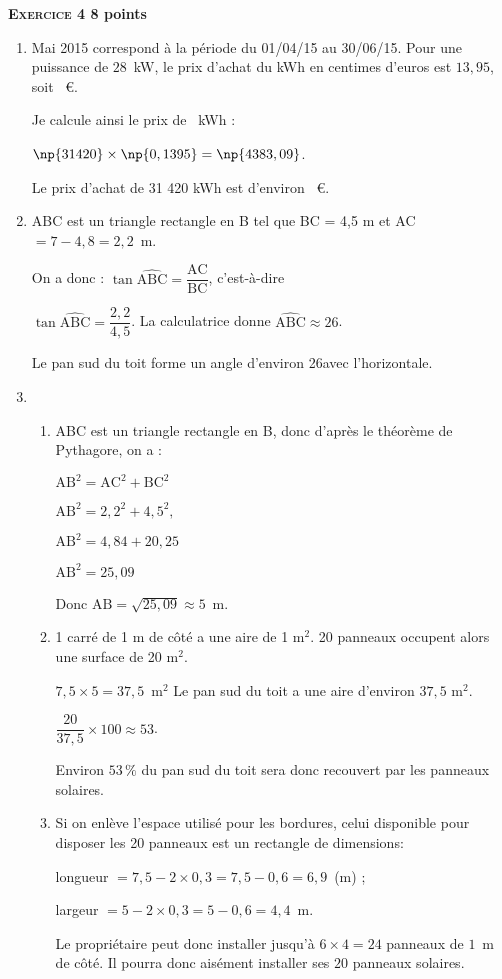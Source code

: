 \textbf{\textsc{Exercice 4} \hfill 8 points}

\medskip

\begin{enumerate}
\item Mai 2015 correspond à la période du 01/04/15 au 30/06/15. Pour une
puissance de $28$~kW, le prix d'achat du kWh en centimes d'euros est $13,95$, soit
 ~\euro. 

Je calcule ainsi le prix de ~kWh :

$\np{31420} \times \np{0,1395} = \np{4383,09}$.

Le prix d'achat de 31 420 kWh est d'environ ~\euro.
\item  ABC est un triangle rectangle en B tel que
BC = 4,5 m et AC $= 7  - 4,8  = 2,2$~m.

On a donc : $\tan \widehat{\text{ABC}} = \dfrac{\text{AC}}{\text{BC}}$, c'est-à-dire

$\tan \widehat{\text{ABC}} = \dfrac{2,2}{4,5}$. La calculatrice donne $\widehat{\text{ABC}} \approx  26$\degres.

Le pan sud du toit forme un angle d'environ 26\degres avec l'horizontale.
\item 
	\begin{enumerate}
		\item ABC est un triangle rectangle en B, donc d'après le théorème de
Pythagore, on a :
		
$\text{AB}^2 = \text{AC}^2 + \text{BC}^2$
		
$\text{AB}^2 = 2,2^2 + 4,5^2,$
		
$\text{AB}^2 = 4,84 + 20,25$
		
$\text{AB}^2 = 25,09$
		
Donc $\text{AB} = \sqrt{25,09} \approx  5$~m.
		\item 1 carré de 1 m de côté a une aire de 1 m$^2$. 20 panneaux occupent alors une
surface de 20 m$^2$.
		
$7,5  \times 5  = 37,5$~m$^2$ Le pan sud du toit a une aire d'environ $37,5$ m$^2$.
		
$\dfrac{20}{37,5} \times 100 \approx 53$.

Environ $53\,\%$ du pan sud du toit sera donc recouvert par les panneaux solaires.
		\item Si on enlève l'espace utilisé pour les bordures, celui disponible pour disposer
les 20 panneaux est un rectangle de dimensions:
		
longueur $= 7,5  - 2 \times 0,3  = 7,5  - 0,6 = 6,9$~(m) ;
		
largeur $= 5 - 2 \times 0,3= 5 - 0,6 = 4,4$~m.
		
Le propriétaire peut donc installer jusqu'à $6 \times 4 = 24$ panneaux de $1$~m de côté. Il
pourra donc aisément installer ses $20$ panneaux solaires.
 	\end{enumerate}
\end{enumerate}

\bigskip

